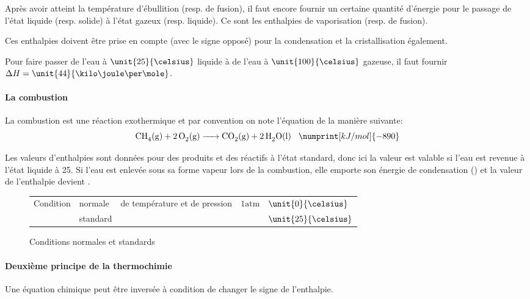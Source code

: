 \documentclass[11pt,a4paper,french]{article}
\newcommand\atm{\mathrm{atm}}
\begin{document}
Après avoir atteint la température d'ébullition (resp. de fusion), il faut encore fournir un certaine quantité d'énergie pour le passage de l'état liquide (resp. solide) à l'état gazeux (resp. liquide).
Ce sont les enthalpies de vaporisation (resp. de fusion).

Ces enthalpies doivent être prise en compte (avec le signe opposé) pour la condensation et la cristallisation également.

Pour faire passer de l'eau à $\unit{25}{\celsius}$ liquide à de l'eau à $\unit{100}{\celsius}$ gazeuse, il faut fournir $\Delta H = \unit{44}{\kilo\joule\per\mole}$.

\paragraph{La combustion}
La combustion est une réaction exothermique et par convention on note l'équation de la manière suivante:
$$\ce{CH4(g) + 2O2(g) -> CO2(g) + 2H2O(l)}\hspace{3mm}\numprint[kJ/mol]{-890}$$

Les valeurs d'enthalpies sont données pour des produits et des réactifs à l'état standard, donc ici la valeur   est valable si l'eau est revenue à l'état liquide à 25\celsius.
Si l'eau est enlevée sous sa forme vapeur lors de la combustion, elle emporte son énergie de condensation () et la valeur de l'enthalpie devient .

\begin{figure}[h!]
	\begin{center}
		\begin{tabular}{|lllll|}
			\hline
			\multirow{2}{*}{Condition} & normale & \multirow{2}{*}{de température et de pression} & \multirow{2}{*}{$\unit{1}{\atm}$} & $\unit{0}{\celsius}$\\
			& standard & & & $\unit{25}{\celsius}$\\
			\hline
		\end{tabular}
	\end{center}
	\label{fig:cntp}
	\caption{Conditions normales et standards}
\end{figure}

\paragraph{Deuxième principe de la thermochimie}
Une équation chimique peut être inversée à condition de changer le signe de l'enthalpie.
\end{document}
